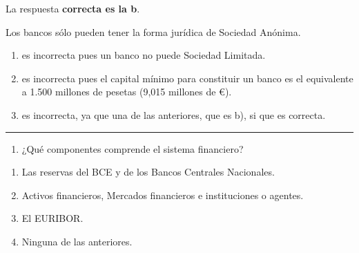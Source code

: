 \documentclass[
  letterpaper,
  DIV=11,
  numbers=noendperiod]{scrreprt}
\providecommand{\tightlist}{%
  \setlength{\itemsep}{0pt}\setlength{\parskip}{0pt}}\usepackage{longtable,booktabs,array}
\begin{document}
\begin{tcolorbox}[enhanced jigsaw, left=2mm, opacityback=0, colback=white, breakable, arc=.35mm, bottomrule=.15mm, rightrule=.15mm, toprule=.15mm, leftrule=.75mm, colframe=quarto-callout-tip-color-frame]
\begin{minipage}[t]{5.5mm}
\textcolor{quarto-callout-tip-color}{\faLightbulb}
\end{minipage}%
\begin{minipage}[t]{\textwidth - 5.5mm}

La respuesta \textbf{correcta es la b}.

Los bancos sólo pueden tener la forma jurídica de Sociedad Anónima.

\begin{enumerate}
\def\labelenumi{\alph{enumi})}
\item
  es incorrecta pues un banco no puede Sociedad Limitada.
\item
  es incorrecta pues el capital mínimo para constituir un banco es el
  equivalente a 1.500 millones de pesetas (9,015 millones de €).
\item
  es incorrecta, ya que una de las anteriores, que es b), si que es
  correcta.
\end{enumerate}

\end{minipage}%
\end{tcolorbox}

\begin{center}\rule{0.5\linewidth}{0.5pt}\end{center}

\begin{enumerate}
\def\labelenumi{\arabic{enumi}.}
\setcounter{enumi}{22}
\tightlist
\item
  ¿Qué componentes comprende el sistema financiero?
\end{enumerate}

\begin{enumerate}
\def\labelenumi{\alph{enumi})}
\item
  Las reservas del BCE y de los Bancos Centrales Nacionales.
\item
  Activos financieros, Mercados financieros e instituciones o agentes.
\item
  El EURIBOR.
\item
  Ninguna de las anteriores.
\end{enumerate}
\end{document}
